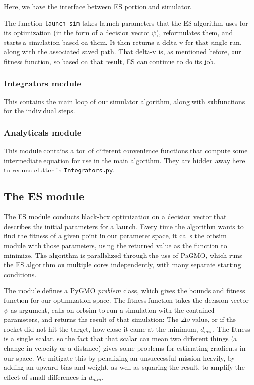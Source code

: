 Here, we have the interface between ES portion and simulator.

\noindent The function \texttt{launch\_sim} takes launch parameters that the ES algorithm uses for its optimization (in the form of a decision vector \(\psi\)), reformulates them, and starts a simulation based on them. It then returns a delta-v for that single run, along with the associated saved path. That delta-v is, as mentioned before, our fitness function, so based on that result, ES can continue to do its job.

\subsubsection{Integrators module}

This contains the main loop of our simulator algorithm, along with subfunctions for the individual steps.

\subsubsection{Analyticals module}

This module contains a ton of different convenience functions that compute some intermediate equation for use in the main algorithm. They are hidden away here to reduce clutter in \texttt{Integrators.py}.

\subsection{The ES module}

The ES module conducts black-box optimization on a decision vector that describes the initial parameters for a launch. Every time the algorithm wants to find the fitness of a given point in our parameter space, it calls the orbsim module with those parameters, using the returned value as the function to minimize. The algorithm is parallelized through the use of PaGMO, which runs the ES algorithm on multiple cores independently, with many separate starting conditions.

The module defines a PyGMO \emph{problem} class, which gives the bounds and fitness function for our optimization space. The fitness function takes the decision vector \(\psi\) as argument, calls on orbsim to run a simulation with the contained parameters, and returns the result of that simulation: The \(\Delta v\) value, or if the rocket did not hit the target, how close it came at the minimum, \(d_{min}\). The fitness is a single scalar, so the fact that that scalar can mean two different things (a change in velocity or a distance) gives some problems for estimating gradients in our space. We mitigate this by penalizing an unsuccessful mission heavily, by adding an upward bias and weight, as well as squaring the result, to amplify the effect of small differences in \(d_{min}\).

